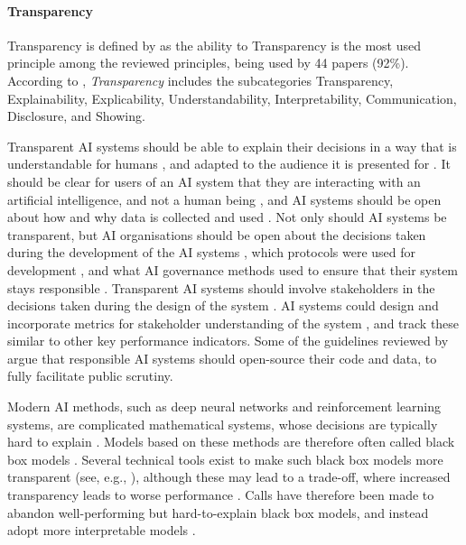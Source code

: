 \paragraph{Transparency}
Transparency is defined by \textcite[p.~2]{Dignum_2017} as the ability to  Transparency is the most used principle among the reviewed principles, being used by 44 papers (92\%). According to \textcite{Ryan_2021}, \textit{Transparency} includes the subcategories Transparency, Explainability, Explicability, Understandability, Interpretability, Communication, Disclosure, and Showing.

Transparent AI systems should be able to explain their decisions in a way that is understandable for humans \parencite{Clarke_2019}, and adapted to the audience it is presented for \parencite{BarredoArrieta_2020,Hacker_2022}. It should be clear for users of an AI system that they are interacting with an artificial intelligence, and not a human being \parencite{Clarke_2019,Nauck_2019}, and AI systems should be open about how and why data is collected and used \parencite{Jobin_2019,Clarke_2019}. Not only should AI systems be transparent, but AI organisations should be open about the decisions taken during the development of the AI systems \parencite{Vakkuri_2022}, which protocols were used for development \parencite{vanBruxvoort_2021}, and what AI governance methods used to ensure that their system stays responsible \parencite{Dignum_2017,Dignum_2019}. Transparent AI systems should involve stakeholders in the decisions taken during the design of the system \parencite{Dignum_2019}. AI systems could design and incorporate metrics for stakeholder understanding of the system \parencite{Havrda_2020}, and track these similar to other key performance indicators. Some of the guidelines reviewed by \textcite{Jobin_2019,Fjeld_2020} argue that responsible AI systems should open-source their code and data, to fully facilitate public scrutiny.


Modern AI methods, such as deep neural networks and reinforcement learning systems, are complicated mathematical systems, whose decisions are typically hard to explain \parencite{BarredoArrieta_2020}. Models based on these methods are therefore often called black box models \parencite{Bélisle-Pipon_2022}. Several technical tools exist to make such black box models more transparent (see, e.g., \cite{BarredoArrieta_2020}), although these may lead to a trade-off, where increased transparency leads to worse performance \parencite{BarredoArrieta_2020}. Calls have therefore been made to abandon well-performing but hard-to-explain black box models, and instead adopt more interpretable models \parencite{Rudin_2019,Rizinski_2022,BarredoArrieta_2020}.

